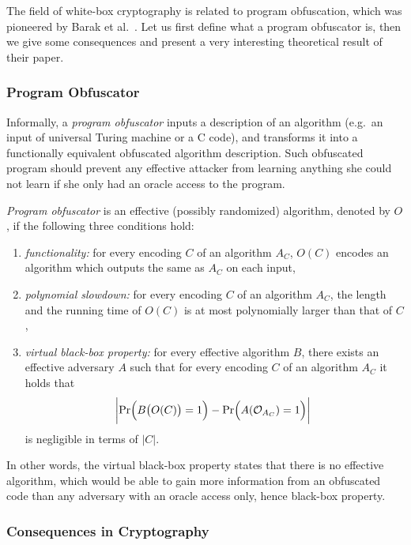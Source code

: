 The field of white-box cryptography is related to program obfuscation, which was pioneered by Barak et al.\ \cite{barak2001possibility}. Let us first define what a program obfuscator is, then we give some consequences and present a very interesting theoretical result of their paper.

\subsubsection{Program Obfuscator}
	
	Informally, a {\em program obfuscator} inputs a description of an algorithm (e.g.\ an input of universal Turing machine or a C code), and transforms it into a functionally equivalent obfuscated algorithm description. Such obfuscated program should prevent any effective attacker from learning anything she could not learn if she only had an oracle access to the program.
	
	\begin{defn}
	\label{def:obfus}
		{\em Program obfuscator} is an effective (possibly randomized) algorithm, denoted by $O$, if the following three conditions hold:
		\begin{enumerate}
			\item {\em functionality:} for every encoding $C$ of an algorithm $A_C$, $O(C)$ encodes an algorithm which outputs the same as $A_C$ on each input,
			\item {\em polynomial slowdown:} for every encoding $C$ of an algorithm $A_C$, the length and the running time of $O(C)$ is at most polynomially larger than that of $C$,
			\item {\em virtual black-box property:} for every effective algorithm $B$, there exists an effective adversary $A$ such that for every encoding $C$ of an algorithm $A_C$ it holds that
			\[
				\biggl| \Pr\Bigl(B\bigl(O(C)\bigr)=1\Bigr) - \Pr\Bigl(A({\cal O}_{A_C})=1\Bigr) \biggr| \
			\]
			is negligible in terms of $|C|$.
		\end{enumerate}
	\end{defn}
	
	In other words, the virtual black-box property states that there is no effective algorithm, which would be able to gain more information from an obfuscated code than any adversary with an oracle access only, hence black-box property.

\subsubsection{Consequences in Cryptography}
	
